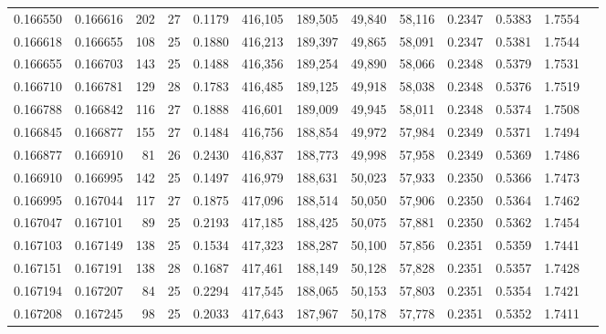 \begin{tabular}{rrrrrrrrrrrrr}
0.166550 & 0.166616 & 202 &  27 &                                     0.1179 & 416,105 & 189,505 &  49,840 &  58,116 & 0.2347 & 0.5383 & 1.7554 \\
0.166618 & 0.166655 & 108 &  25 &                                     0.1880 & 416,213 & 189,397 &  49,865 &  58,091 & 0.2347 & 0.5381 & 1.7544 \\
0.166655 & 0.166703 & 143 &  25 &                                     0.1488 & 416,356 & 189,254 &  49,890 &  58,066 & 0.2348 & 0.5379 & 1.7531 \\
0.166710 & 0.166781 & 129 &  28 &                                     0.1783 & 416,485 & 189,125 &  49,918 &  58,038 & 0.2348 & 0.5376 & 1.7519 \\
0.166788 & 0.166842 & 116 &  27 &                                     0.1888 & 416,601 & 189,009 &  49,945 &  58,011 & 0.2348 & 0.5374 & 1.7508 \\
0.166845 & 0.166877 & 155 &  27 &                                     0.1484 & 416,756 & 188,854 &  49,972 &  57,984 & 0.2349 & 0.5371 & 1.7494 \\
0.166877 & 0.166910 &  81 &  26 &                                     0.2430 & 416,837 & 188,773 &  49,998 &  57,958 & 0.2349 & 0.5369 & 1.7486 \\
0.166910 & 0.166995 & 142 &  25 &                                     0.1497 & 416,979 & 188,631 &  50,023 &  57,933 & 0.2350 & 0.5366 & 1.7473 \\
0.166995 & 0.167044 & 117 &  27 &                                     0.1875 & 417,096 & 188,514 &  50,050 &  57,906 & 0.2350 & 0.5364 & 1.7462 \\
0.167047 & 0.167101 &  89 &  25 &                                     0.2193 & 417,185 & 188,425 &  50,075 &  57,881 & 0.2350 & 0.5362 & 1.7454 \\
0.167103 & 0.167149 & 138 &  25 &                                     0.1534 & 417,323 & 188,287 &  50,100 &  57,856 & 0.2351 & 0.5359 & 1.7441 \\
0.167151 & 0.167191 & 138 &  28 &                                     0.1687 & 417,461 & 188,149 &  50,128 &  57,828 & 0.2351 & 0.5357 & 1.7428 \\
0.167194 & 0.167207 &  84 &  25 &                                     0.2294 & 417,545 & 188,065 &  50,153 &  57,803 & 0.2351 & 0.5354 & 1.7421 \\
0.167208 & 0.167245 &  98 &  25 &                                     0.2033 & 417,643 & 187,967 &  50,178 &  57,778 & 0.2351 & 0.5352 & 1.7411 \\

\end{tabular}
